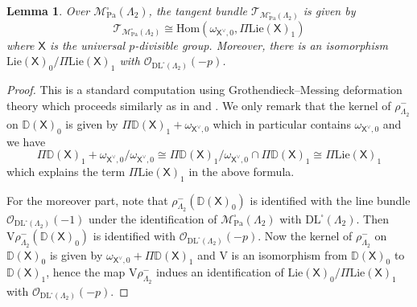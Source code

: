 \documentclass[10pt]{amsart}
\numberwithin{equation}{section}
\newtheorem{lemma}[equation]{Lemma}
\theoremstyle{definition}
\def\Lie{\mathrm{Lie}}
\def\Pa{\mathrm{Pa}}
\def\calM{\mathcal{M}}
\def\calO{\mathcal{O}}
\def\calT{\mathcal{T}}
\def\DD{\mathbb{D}}
\def\FF{\mathbb{F}}
\def\sfX{\mathsf{X}}
\def\rmD{\mathrm{D}}
\def\rmV{\mathrm{V}}
\begin{document}
 \begin{lemma}\label{tan-2}
Over $\calM^{\square}_{\Pa}(\Lambda_{2})$, the tangent bundle $\calT_{\calM^{\square}_{\Pa}(\Lambda_{2})}$ is given by
\begin{equation*}
\calT_{\calM^{\square}_{\Pa}(\Lambda_{2})}\cong \mathrm{Hom}(\omega_{\sfX^{\vee},0}, \Pi\Lie(\sfX)_{1})
\end{equation*}
where $\sfX$ is the universal $p$-divisible group. Moreover, there is an isomorphism $\Lie(\sfX)_{0}/\Pi\Lie(\sfX)_{1}$ with $\calO_{\mathrm{DL}^{\square}(\Lambda_{2})}(-p)$.
\end{lemma}
\begin{proof}
This is a standard computation using  Grothendieck--Messing deformation theory which proceeds similarly as in \cite[Theorem 4.3.5]{LTXZZ} and \cite[Theorem 6.37]{Sweeting}. We only remark that the kernel of $\rho^{-}_{\Lambda_{2}}$ on $\DD(\sfX)_{0}$ is given by $\Pi\DD(\sfX)_{1}+\omega_{\sfX^{\vee}, 0}$ which in particular contains $\omega_{\sfX^{\vee}, 0}$ and we have
\begin{equation*}
\Pi\DD(\sfX)_{1}+\omega_{\sfX^{\vee}, 0}/\omega_{\sfX^{\vee}, 0}\cong \Pi\DD(\sfX)_{1}/\omega_{\sfX^{\vee}, 0}\cap\Pi\DD(\sfX)_{1}\cong \Pi\Lie(\sfX)_{1}
\end{equation*}
which explains the term $\Pi\Lie(\sfX)_{1}$ in  the above formula.

For the moreover part, note that $\rho^{-}_{\Lambda_{2}}(\DD(\sfX)_{0})$ is identified with the line bundle $\calO_{\mathrm{DL}^{\square}(\Lambda_{2})}(-1)$ under the identification of $\calM^{\square}_{\Pa}(\Lambda_{2})$ with $\mathrm{DL}^{\square}(\Lambda_{2})$. Then $\rmV\rho^{-}_{\Lambda_{2}}(\DD(\sfX)_{0})$ is identified with $\calO_{\mathrm{DL}^{\square}(\Lambda_{2})}(-p)$. Now the kernel of $\rho^{-}_{\Lambda_{2}}$ on $\DD(\sfX)_{0}$ is given by $\omega_{\sfX^{\vee}, 0}+\Pi\DD(\sfX)_{1}$ and $\rmV$ is an isomorphism from $\DD(\sfX)_{0}$ to $\DD(\sfX)_{1}$, hence the map $\rmV\rho^{-}_{\Lambda_{2}}$ indues an identification of $\Lie(\sfX)_{0}/\Pi\Lie(\sfX)_{1}$ with $\calO_{\mathrm{DL}^{\square}(\Lambda_{2})}(-p)$.
\end{proof}

\end{document}

